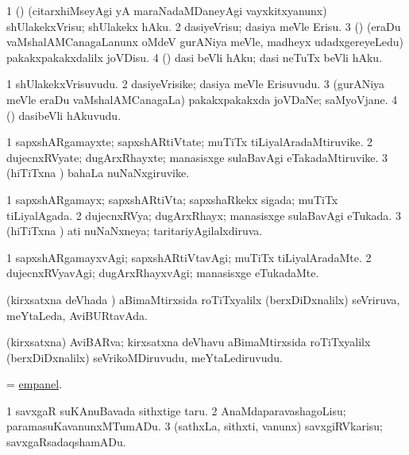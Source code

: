 \bentry
{}
\gl{\sakirx}
\bmng
\bnum
\num{1} (\ca) (citarxhiMseyAgi yA maraNadaMDaneyAgi vayxkitxyanunx) shUlakekxVrisu; shUlakekx hAku. 
\num{2} dasiyeVrisu; dasiya meVle Erisu. 
\num{3} (\vaMlAM) (eraDu vaMshalAMCanagaLanunx oMdeV gurANiya meVle, madheyx udadxgereyeLedu) pakakxpakakxdalilx joVDisu. 
\num{4} (\viparx) dasi beVli hAku; dasi neTuTx beVli hAku. 
\enum
\emng
\eentry

\bentry
{}
\gl{\nA}
\bmng
\bnum
\num{1} shUlakekxVrisuvudu. 
\num{2} dasiyeVrisike; dasiya meVle Erisuvudu. 
\num{3} (gurANiya meVle eraDu vaMshalAMCanagaLa) pakakxpakakxda joVDaNe; saMyoVjane. 
\num{4} (\viparx) dasibeVli hAkuvudu. 
\enum
\emng
\eentry

\bentry
{}
\gl{\nA}
\bmng
\bnum
\num{1} sapxshARgamayxte; sapxshARtiVtate; muTiTx tiLiyalAradaMtiruvike. 
\num{2} dujecnxRVyate; dugArxRhayxte; manasisxge sulaBavAgi eTakadaMtiruvike. 
\num{3} (hiTiTxna \vi) bahaLa nuNaNxgiruvike. 
\enum
\emng
\eentry

\bentry
{}
\gl{\gu}
\bmng
\bnum
\num{1} sapxshARgamayx; sapxshARtiVta; sapxshaRkekx sigada; muTiTx tiLiyalAgada. 
\num{2} dujecnxRVya; dugArxRhayx; manasisxge sulaBavAgi eTukada. 
\num{3} (hiTiTxna \vi) ati nuNaNxneya; taritariyAgilalxdiruva. 
\enum
\emng
\eentry

\bentry
{}
\gl{\kirxvi}
\bmng
\bnum
\num{1} sapxshARgamayxvAgi; sapxshARtiVtavAgi; muTiTx tiLiyalAradaMte. 
\num{2} dujecnxRVyavAgi; dugArxRhayxvAgi; manasisxge eTukadaMte. 
\enum
\emng
\eentry

\bentry
{}
\gl{\gu}
\bmng
(kirxsatxna deVhada \vi) aBimaMtirxsida roTiTxyalilx (berxDiDxnalilx) seVriruva, meYtaLeda, AviBURtavAda. 
\emng
\eentry

\bentry
{}
\gl{\nA}
\bmng
(kirxsatxna) AviBARva; kirxsatxna deVhavu aBimaMtirxsida roTiTxyalilx (berxDiDxnalilx) seVrikoMDiruvudu, meYtaLediruvudu. 
\emng
\eentry

\bentry
{}
\gl{\sakirx}
\bmng
= \hyperref{kandict_e.pdf}{E}{empanel}{empanel}. 
\emng
\eentry

\bentry
{}
\gl{\sakirx}
\bmng
\bnum
\num{1} savxgaR suKAnuBavada sithxtige taru. 
\num{2} AnaMdaparavashagoLisu; paramasuKavanunxMTumADu. 
\num{3} (sathxLa, sithxti, \mo vanunx) savxgiRVkarisu; savxgaRsadaqshamADu. 
\enum
\emng
\eentry

